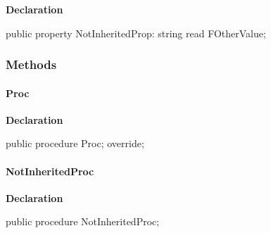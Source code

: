 \documentclass{report}
\begin{document}
\begin{list}{}{
\setlength{\itemindent}{0cm}
\setlength{\listparindent}{0cm}
\setlength{\leftmargin}{\evensidemargin}
\addtolength{\leftmargin}{\tmplength}
\settowidth{\labelsep}{X}
\addtolength{\leftmargin}{\labelsep}
\setlength{\labelwidth}{\tmplength}
}
\begin{flushleft}
\item[\textbf{Declaration}\hfill]
\begin{ttfamily}
public property NotInheritedProp: string read FOtherValue;\end{ttfamily}


\end{flushleft}
\end{list}
\subsubsection*{\large{\textbf{Methods}}\normalsize\hspace{1ex}\hfill}
\paragraph*{Proc}\hspace*{\fill}

\begin{list}{}{
\setlength{\itemindent}{0cm}
\setlength{\listparindent}{0cm}
\setlength{\leftmargin}{\evensidemargin}
\addtolength{\leftmargin}{\tmplength}
\settowidth{\labelsep}{X}
\addtolength{\leftmargin}{\labelsep}
\setlength{\labelwidth}{\tmplength}
}
\begin{flushleft}
\item[\textbf{Declaration}\hfill]
\begin{ttfamily}
public procedure Proc; override;\end{ttfamily}


\end{flushleft}
\end{list}
\paragraph*{NotInheritedProc}\hspace*{\fill}

\begin{list}{}{
\setlength{\itemindent}{0cm}
\setlength{\listparindent}{0cm}
\setlength{\leftmargin}{\evensidemargin}
\addtolength{\leftmargin}{\tmplength}
\settowidth{\labelsep}{X}
\addtolength{\leftmargin}{\labelsep}
\setlength{\labelwidth}{\tmplength}
}
\begin{flushleft}
\item[\textbf{Declaration}\hfill]
\begin{ttfamily}
public procedure NotInheritedProc;\end{ttfamily}


\end{flushleft}
\end{list}
\end{document}

